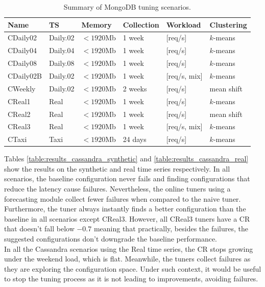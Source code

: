 \documentclass[a4paper, 12pt]{article} %
\newcommand{\ra}[1]{\renewcommand{\arraystretch}{#1}}
\begin{document}
	\begin{table}\centering 
		\ra{1.3}
		\begin{tabularx}{\textwidth}{@{}llllXX@{}}
			\midrule
			Name & TS & Memory & Collection & Workload & Clustering\\
			\midrule
			CDaily02&Daily.02 & $<1920$Mb  & 1 week & [req/s]  & $k$-means\\
			CDaily04&Daily.04 & $<1920$Mb  & 1 week & [req/s]  & $k$-means\\
			CDaily08&Daily.08 & $<1920$Mb  & 1 week & [req/s] & $k$-means\\
			CDaily02B&Daily.02 & $<1920$Mb  & 1 week & [req/s, mix] & $k$-means\\
			CWeekly&Daily.02 & $<1920$Mb  & 2 weeks & [req/s]  & mean shift\\
			CReal1&Real & $<1920$Mb  & 1 week & [req/s]  & $k$-means\\
			CReal2&Real & $<1920$Mb  & 1 week & [req/s]  & mean shift\\
			CReal3&Real & $<1920$Mb  & 1 week & [req/s, mix]  & $k$-means\\
			CTaxi &Taxi & $<1920$Mb  & 24 days & [req/s]  & $k$-means\\
			
			\bottomrule
		\end{tabularx}
		\caption{Summary of MongoDB tuning scenarios. }  \label{table:results_tuning_scenarios_cassandra}
	\end{table}

	Tables \ref{table:results_cassandra_synthetic} and \ref{table:results_cassandra_real} show the results on the synthetic and real time series respectively.
	In all scenarios, the baseline configuration never fails and finding configurations that reduce the latency cause failures. Nevertheless, the online tuners using a forecasting module collect fewer failures when compared to the naive tuner. Furthermore, the tuner always instantly finds a better configuration than the baseline in all scenarios except CReal3. However, all CReal3 tuners have a CR that doesn't fall below $-0.7$ meaning that practically, besides the failures, the suggested configurations don't downgrade the baseline performance. \\
	In all the Cassandra scenarios using the Real time series, the CR stops growing under the weekend load, which is flat. Meanwhile, the tuners collect failures as they are exploring the configuration space. Under such context, it would be useful to stop the tuning process as it is not leading to improvements, avoiding failures.
	
\end{document}
